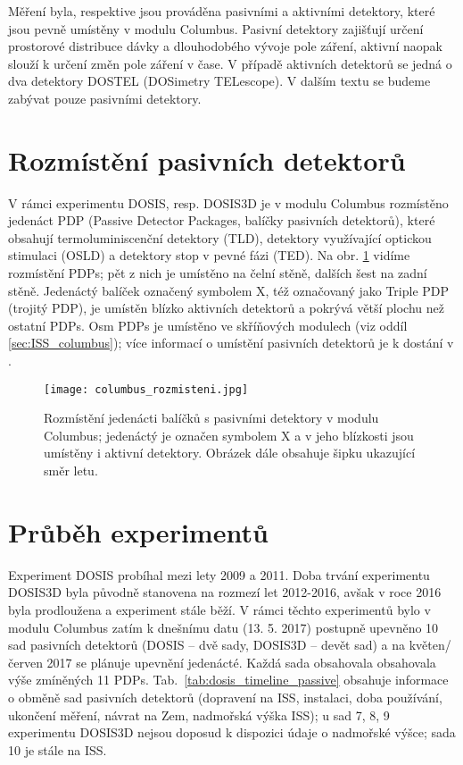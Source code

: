 Měření byla, respektive jsou prováděna pasivními a aktivními detektory, které jsou pevně umístěny v modulu Columbus. Pasivní detektory zajišťují určení prostorové distribuce dávky a dlouhodobého vývoje pole záření, aktivní naopak slouží k určení změn pole záření v čase. V případě aktivních detektorů se jedná o dva detektory DOSTEL (DOSimetry TELescope). V dalším textu se budeme zabývat pouze pasivními detektory.

\section{Rozmístění pasivních detektorů}
V rámci experimentu DOSIS, resp. DOSIS3D je v modulu Columbus rozmístěno jedenáct PDP (Passive Detector Packages, balíčky pasivních detektorů), které obsahují termoluminiscenční detektory (TLD), detektory využívající optickou stimulaci (OSLD) a detektory stop v pevné fázi (TED). Na obr. \ref{fig:columbus_rozmisteni} vidíme rozmístění PDPs; pět z nich je umístěno na čelní stěně, dalších šest na zadní stěně. Jedenáctý balíček označený symbolem X, též označovaný jako Triple PDP (trojitý PDP), je umístěn blízko aktivních detektorů a pokrývá větší plochu než ostatní PDPs. Osm PDPs je umístěno ve skříňových modulech (viz oddíl \ref{sec:ISS_columbus}); více informací o umístění pasivních detektorů je k dostání v \cite{dosis}. %
\begin{figure}[ht]
  \centering
  \texttt{[image: columbus\_rozmisteni.jpg]}
  \caption{Rozmístění jedenácti balíčků s pasivními detektory v modulu Columbus; jedenáctý je označen symbolem X a v jeho blízkosti jsou umístěny i aktivní detektory. Obrázek dále obsahuje šipku ukazující směr letu. \cite{dosis}}
  \label{fig:columbus_rozmisteni}
\end{figure}

\section{Průběh experimentů}%
Experiment DOSIS probíhal mezi lety 2009 a 2011. Doba trvání experimentu DOSIS3D byla původně stanovena na rozmezí let 2012-2016, avšak v roce 2016 byla prodloužena a experiment stále běží. V rámci těchto experimentů bylo v modulu Columbus zatím k dnešnímu datu (13. 5. 2017) postupně upevněno 10 sad pasivních detektorů (DOSIS -- dvě sady, DOSIS3D -- devět sad) a na květen/červen 2017 se plánuje upevnění jedenácté. Každá sada obsahovala obsahovala výše zmíněných 11 PDPs. Tab.~\ref{tab:dosis_timeline_passive} obsahuje informace o obměně sad pasivních detektorů (dopravení na ISS, instalaci, doba používání, ukončení měření,
návrat na Zem, nadmořská výška ISS); u sad 7, 8, 9 experimentu DOSIS3D nejsou doposud k dispozici údaje o nadmořské výšce; sada 10 je stále na ISS. 

